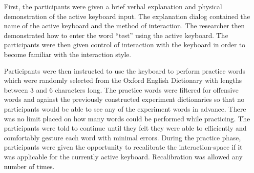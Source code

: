 \begin{table}[t] %
	\centering
	\caption[Pilot Study Schedule of Assessments]{\centering Schedule of Assessments for a single study visit during the pilot study (in minutes).}
	\label{pilot_schedule_of_assessments}
\end{table}

First, the participants were given a brief verbal explanation and physical demonstration of the active keyboard input. The explanation dialog contained the name of the active keyboard and the method of interaction. The researcher then demonstrated how to enter the word ``test'' using the active keyboard. The participants were then given control of interaction with the keyboard in order to become familiar with the interaction style.

Participants were then instructed to use the keyboard to perform practice words which were randomly selected from the Oxford English Dictionary with lengths between 3 and 6 characters long. The practice words were filtered for offensive words and against the previously constructed experiment dictionaries so that no participants would be able to see any of the experiment words in advance. There was no limit placed on how many words could be performed while practicing. The participants were told to continue until they felt they were able to efficiently and comfortably gesture each word with minimal errors. During the practice phase, participants were given the opportunity to recalibrate the interaction-space if it was applicable for the currently active keyboard. Recalibration was allowed any number of times.

